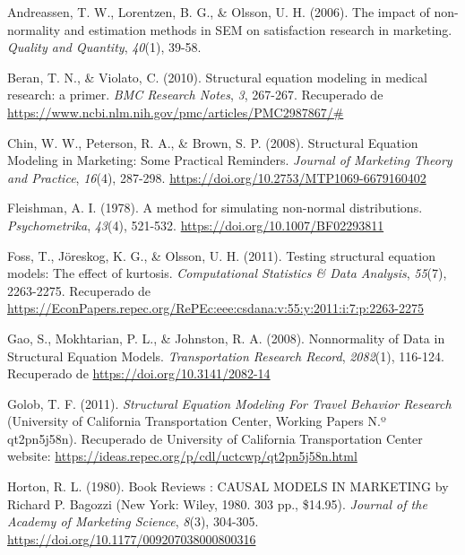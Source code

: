\documentclass[
]{article}
\newlength{\cslhangindent}
\newenvironment{cslreferences}%
  {\setlength{\parindent}{0pt}%
  \everypar{\setlength{\hangindent}{\cslhangindent}}\ignorespaces}%
  {\par}
\begin{document}
\hypertarget{refs}{}
\begin{cslreferences}
\leavevmode\hypertarget{ref-andreassen}{}%
Andreassen, T. W., Lorentzen, B. G., \& Olsson, U. H. (2006). The impact
of non-normality and estimation methods in SEM on satisfaction research
in marketing. \emph{Quality and Quantity}, \emph{40}(1), 39-58.

\leavevmode\hypertarget{ref-Beran2010StructuralEM}{}%
Beran, T. N., \& Violato, C. (2010). Structural equation modeling in
medical research: a primer. \emph{BMC Research Notes}, \emph{3},
267-267. Recuperado de
\url{https://www.ncbi.nlm.nih.gov/pmc/articles/PMC2987867/\#}

\leavevmode\hypertarget{ref-chin}{}%
Chin, W. W., Peterson, R. A., \& Brown, S. P. (2008). Structural
Equation Modeling in Marketing: Some Practical Reminders. \emph{Journal
of Marketing Theory and Practice}, \emph{16}(4), 287-298.
\url{https://doi.org/10.2753/MTP1069-6679160402}

\leavevmode\hypertarget{ref-Fleishman1978}{}%
Fleishman, A. I. (1978). A method for simulating non-normal
distributions. \emph{Psychometrika}, \emph{43}(4), 521-532.
\url{https://doi.org/10.1007/BF02293811}

\leavevmode\hypertarget{ref-foss}{}%
Foss, T., Jöreskog, K. G., \& Olsson, U. H. (2011). Testing structural
equation models: The effect of kurtosis. \emph{Computational Statistics
\& Data Analysis}, \emph{55}(7), 2263-2275. Recuperado de
\url{https://EconPapers.repec.org/RePEc:eee:csdana:v:55:y:2011:i:7:p:2263-2275}

\leavevmode\hypertarget{ref-gao}{}%
Gao, S., Mokhtarian, P. L., \& Johnston, R. A. (2008). Nonnormality of
Data in Structural Equation Models. \emph{Transportation Research
Record}, \emph{2082}(1), 116-124. Recuperado de
\href{\%20https://doi.org/10.3141/2082-14}{https://doi.org/10.3141/2082-14}

\leavevmode\hypertarget{ref-golob}{}%
Golob, T. F. (2011). \emph{Structural Equation Modeling For Travel
Behavior Research} (University of California Transportation Center,
Working Papers N.º qt2pn5j58n). Recuperado de University of California
Transportation Center website:
\url{https://ideas.repec.org/p/cdl/uctcwp/qt2pn5j58n.html}

\leavevmode\hypertarget{ref-bagozzi}{}%
Horton, R. L. (1980). Book Reviews : CAUSAL MODELS IN MARKETING by
Richard P. Bagozzi (New York: Wiley, 1980. 303 pp., \$14.95).
\emph{Journal of the Academy of Marketing Science}, \emph{8}(3),
304-305. \url{https://doi.org/10.1177/009207038000800316}


\end{cslreferences}
\end{document}
